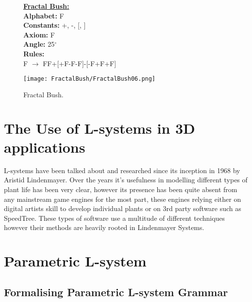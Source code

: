 \begin{figure}[htbp]
	\raggedright
	\textbf{\underline{Fractal Bush:}} \\
	\textbf{Alphabet:} F\\
	\textbf{Constants:} +, -, [, ] \\
	\textbf{Axiom:} F \\
	\textbf{Angle:} 25$^\circ$ \\
	\textbf{Rules:} \\
	F $\rightarrow$ FF+[+F-F-F]-[-F+F+F]\\
	{\centering
		\vspace{7px}
		\texttt{[image: FractalBush/FractalBush06.png]}
		\caption{Fractal Bush.}
	}
\end{figure}

\FloatBarrier
\newpage

\section{The Use of L-systems in 3D applications}

L-systems have been talked about and researched since its inception in 1968 by Aristid Lindenmayer. Over the years it's usefulness in modelling different types of plant life has been very clear, however its presence has been quite absent from any mainstream game engines for the most part, these engines relying either on digital artists skill to develop individual plants or on 3rd party software such as SpeedTree. These types of software use a multitude of different techniques however their methods are heavily rooted in Lindenmayer Systems. 

\newpage

\section{Parametric L-system}

\subsection{Formalising Parametric L-system Grammar}

